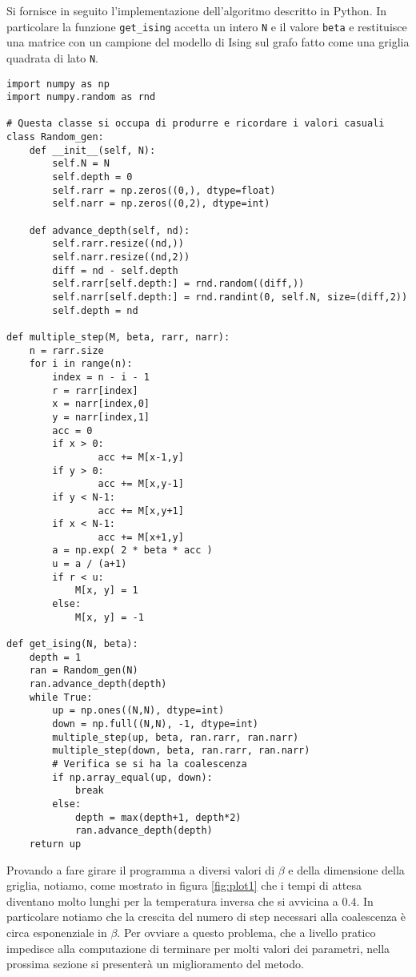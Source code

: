 \documentclass[]{marticle}
\begin{document}
Si fornisce in seguito l'implementazione dell'algoritmo descritto in Python. In
particolare la funzione \texttt{get\_ising} accetta un intero \texttt{N} e il
valore \texttt{beta} e restituisce una matrice con un campione del modello di
Ising sul grafo fatto come una griglia quadrata di lato \texttt{N}.

\begin{lstlisting}
import numpy as np
import numpy.random as rnd

# Questa classe si occupa di produrre e ricordare i valori casuali
class Random_gen:
    def __init__(self, N):
        self.N = N
        self.depth = 0
        self.rarr = np.zeros((0,), dtype=float)
        self.narr = np.zeros((0,2), dtype=int)

    def advance_depth(self, nd):
        self.rarr.resize((nd,))
        self.narr.resize((nd,2))
        diff = nd - self.depth
        self.rarr[self.depth:] = rnd.random((diff,))
        self.narr[self.depth:] = rnd.randint(0, self.N, size=(diff,2))
        self.depth = nd

def multiple_step(M, beta, rarr, narr):
    n = rarr.size
    for i in range(n):
        index = n - i - 1
        r = rarr[index]
        x = narr[index,0]
        y = narr[index,1]
        acc = 0
        if x > 0:
                acc += M[x-1,y]
        if y > 0:
                acc += M[x,y-1]
        if y < N-1:
                acc += M[x,y+1]
        if x < N-1:
                acc += M[x+1,y]
        a = np.exp( 2 * beta * acc )
        u = a / (a+1)
        if r < u:
            M[x, y] = 1
        else:
            M[x, y] = -1

def get_ising(N, beta):
    depth = 1
    ran = Random_gen(N)
    ran.advance_depth(depth)
    while True:
        up = np.ones((N,N), dtype=int)
        down = np.full((N,N), -1, dtype=int)
        multiple_step(up, beta, ran.rarr, ran.narr)
        multiple_step(down, beta, ran.rarr, ran.narr)
        # Verifica se si ha la coalescenza
        if np.array_equal(up, down): 
            break
        else:
            depth = max(depth+1, depth*2)
            ran.advance_depth(depth)
    return up
\end{lstlisting}

Provando a fare girare il programma a diversi valori di $\beta$ e della
dimensione della griglia, notiamo, come mostrato in figura \ref{fig:plot1} che i
tempi di attesa diventano molto lunghi per la temperatura inversa che si
avvicina a $0.4$. In particolare notiamo che la crescita del numero di step
necessari alla coalescenza \`e circa esponenziale in $\beta$. Per ovviare a
questo problema, che a livello pratico impedisce alla computazione di terminare
per molti valori dei parametri, nella prossima sezione si presenter\`a un
miglioramento del metodo.
\end{document}
